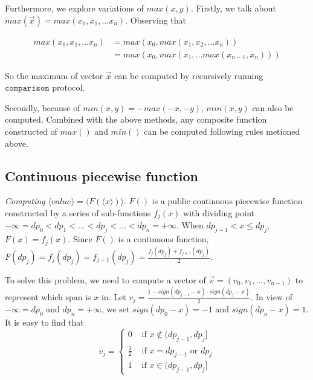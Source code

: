 \documentclass[letterpaper]{article} %
\begin{document}
       Furthermore, we explore variations of $max(x,y)$.
       Firstly, we talk about $max(\overrightarrow{x})=max(x_{0},x_{1},...x_{n})$. Observing that

       \begin{align*}
           max(x_{0},x_{1},...x_{n}) &= max(x_{0},max(x_{1},x_{2},...x_{n})) \\
         &= max(x_{0},max(x_{1},...max(x_{n-1},x_{n})))
       \end{align*}

       So the maximum of vector $\overrightarrow{x}$ can be computed by recursively running $\mathtt{comparison}$ protocol.

       Secondly, because of $min(x,y)=-max(-x,-y)$,  $min(x,y)$ can also be computed.
       Combined with the above methods,
       any composite function constructed of $max()$ and $min()$ can be computed following rules metioned above.






       \subsection{Continuous piecewise function}
       \emph{Computing} $\langle value\rangle  = \langle F(\langle x\rangle)\rangle $.
       $F()$ is a public continuous piecewise function constructed by a series of sub-functions $f_{j}(x)$
       with dividing point $-\infty =dp_{0}<dp_{1}<...<dp_{j}<...<dp_{n}=+\infty$.
       When $dp_{j-1}< x\leq dp_{j}$, $F(x) =f_{j}(x)$.
       Since $F()$ is a continuous function, $F(dp_{j}) =f_{j}(dp_{j})=f_{j+1}(dp_{j})=\frac{f_{j}(dp_{j})+f_{j+1}(dp_{j})}{2}$.


       To solve this problem, we need to compute a vector of
       $\overrightarrow{v}=(v_{0},v_{1},...,v_{n-1})$ to represent which span is $x$ in.
       Let $v_{j} = \frac{1-sign(dp_{j-1}-x)\cdot sign(dp_{j}-x)}{2}$.
       In view of $-\infty =dp_{0}$ and $dp_{n}=+\infty$,
       we set $sign(dp_{0}-x)=-1$ and $sign(dp_{n}-x)=1$.
       It is easy to find that
       $$v_{j}=\begin{cases}
           0 & \text{ if } x\notin (dp_{j-1},dp_{j}] \\
           \frac{1}{2} & \text{ if } x = dp_{j-1} \text{ or } dp_{j}\\
           1 & \text{ if } x\in (dp_{j-1},dp_{j}]
          \end{cases}$$
\end{document}
